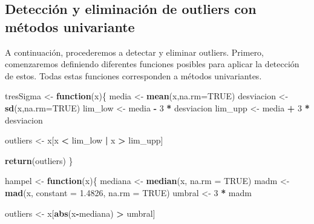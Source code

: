\documentclass[notspecified,article,submit,moreauthors,pdftex]{Definitions/mdpi}
\newenvironment{Shaded}{\begin{snugshade}}{\end{snugshade}}
\newcommand{\AttributeTok}[1]{\textcolor[rgb]{0.13,0.29,0.53}{#1}}
\newcommand{\ConstantTok}[1]{\textcolor[rgb]{0.56,0.35,0.01}{#1}}
\newcommand{\ControlFlowTok}[1]{\textcolor[rgb]{0.13,0.29,0.53}{\textbf{#1}}}
\newcommand{\DecValTok}[1]{\textcolor[rgb]{0.00,0.00,0.81}{#1}}
\newcommand{\FloatTok}[1]{\textcolor[rgb]{0.00,0.00,0.81}{#1}}
\newcommand{\FunctionTok}[1]{\textcolor[rgb]{0.13,0.29,0.53}{\textbf{#1}}}
\newcommand{\NormalTok}[1]{#1}
\newcommand{\OtherTok}[1]{\textcolor[rgb]{0.56,0.35,0.01}{#1}}
\newcommand{\SpecialCharTok}[1]{\textcolor[rgb]{0.81,0.36,0.00}{\textbf{#1}}}
\begin{document}
\hypertarget{detecciuxf3n-y-eliminaciuxf3n-de-outliers-con-muxe9todos-univariante}{%
\subsection{Detección y eliminación de outliers con métodos
univariante}\label{detecciuxf3n-y-eliminaciuxf3n-de-outliers-con-muxe9todos-univariante}}

A continuación, procederemos a detectar y eliminar outliers. Primero,
comenzaremos definiendo diferentes funciones posibles para aplicar la
detección de estos. Todas estas funciones corresponden a métodos
univariantes.

\begin{Shaded}
\begin{Highlighting}[]
\NormalTok{tresSigma }\OtherTok{\textless{}{-}} \ControlFlowTok{function}\NormalTok{(x)\{}
\NormalTok{  media }\OtherTok{\textless{}{-}} \FunctionTok{mean}\NormalTok{(x,}\AttributeTok{na.rm=}\ConstantTok{TRUE}\NormalTok{)}
\NormalTok{  desviacion }\OtherTok{\textless{}{-}} \FunctionTok{sd}\NormalTok{(x,}\AttributeTok{na.rm=}\ConstantTok{TRUE}\NormalTok{)}
\NormalTok{  lim\_low }\OtherTok{\textless{}{-}}\NormalTok{ media }\SpecialCharTok{{-}} \DecValTok{3} \SpecialCharTok{*}\NormalTok{ desviacion}
\NormalTok{  lim\_upp }\OtherTok{\textless{}{-}}\NormalTok{ media }\SpecialCharTok{+} \DecValTok{3} \SpecialCharTok{*}\NormalTok{ desviacion}
  
\NormalTok{  outliers }\OtherTok{\textless{}{-}}\NormalTok{ x[x }\SpecialCharTok{\textless{}}\NormalTok{ lim\_low }\SpecialCharTok{|}\NormalTok{ x }\SpecialCharTok{\textgreater{}}\NormalTok{ lim\_upp]}
  
  \FunctionTok{return}\NormalTok{(outliers)}
\NormalTok{\}}

\NormalTok{hampel }\OtherTok{\textless{}{-}} \ControlFlowTok{function}\NormalTok{(x)\{}
\NormalTok{  mediana }\OtherTok{\textless{}{-}} \FunctionTok{median}\NormalTok{(x, }\AttributeTok{na.rm =} \ConstantTok{TRUE}\NormalTok{)}
\NormalTok{  madm }\OtherTok{\textless{}{-}} \FunctionTok{mad}\NormalTok{(x, }\AttributeTok{constant =} \FloatTok{1.4826}\NormalTok{, }\AttributeTok{na.rm =} \ConstantTok{TRUE}\NormalTok{)}
\NormalTok{  umbral }\OtherTok{\textless{}{-}} \DecValTok{3} \SpecialCharTok{*}\NormalTok{ madm}
  
\NormalTok{  outliers }\OtherTok{\textless{}{-}}\NormalTok{ x[}\FunctionTok{abs}\NormalTok{(x}\SpecialCharTok{{-}}\NormalTok{mediana) }\SpecialCharTok{\textgreater{}}\NormalTok{ umbral]}
  

\end{Highlighting}
\end{Shaded}
\end{document}
